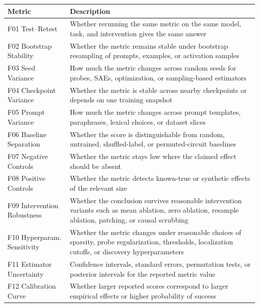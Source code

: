 \documentclass{article}
\begin{document}
\begin{minipage}{\linewidth}
\par
\begin{center}
\begin{tabular}{@{}lp{10cm}@{}}
\toprule
\textbf{Metric} & \textbf{Description} \\
\midrule
F01 Test--Retest & Whether rerunning the same metric on the same model, task, and intervention gives the same answer \\
\midrule
F02 Bootstrap Stability & Whether the metric remains stable under bootstrap resampling of prompts, examples, or activation samples \\
\midrule
F03 Seed Variance & How much the metric changes across random seeds for probes, SAEs, optimization, or sampling-based estimators \\
\midrule
F04 Checkpoint Variance & Whether the metric is stable across nearby checkpoints or depends on one training snapshot \\
\midrule
F05 Prompt Variance & How much the metric changes across prompt templates, paraphrases, lexical choices, or dataset slices \\
\midrule
F06 Baseline Separation & Whether the score is distinguishable from random, untrained, shuffled-label, or permuted-circuit baselines \\
\midrule
F07 Negative Controls & Whether the metric stays low where the claimed effect should be absent \\
\midrule
F08 Positive Controls & Whether the metric detects known-true or synthetic effects of the relevant size \\
\midrule
F09 Intervention Robustness & Whether the conclusion survives reasonable intervention variants such as mean ablation, zero ablation, resample ablation, patching, or causal scrubbing \\
\midrule
F10 Hyperparam. Sensitivity & Whether the metric changes under reasonable choices of sparsity, probe regularization, thresholds, localization cutoffs, or discovery hyperparameters \\
\midrule
F11 Estimator Uncertainty & Confidence intervals, standard errors, permutation tests, or posterior intervals for the reported metric value \\
\midrule
F12 Calibration Curve & Whether larger reported scores correspond to larger empirical effects or higher probability of success \\

\end{tabular}
\end{center}
\end{minipage}
\end{document}
